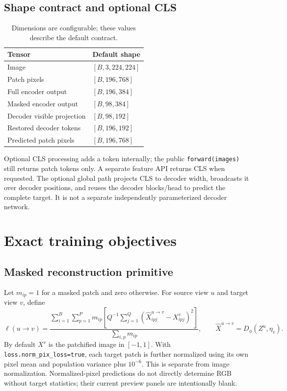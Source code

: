 \documentclass[11pt,a4paper]{article}
\newcommand{\code}[1]{\nolinkurl{#1}}
\begin{document}
\subsection{Shape contract and optional CLS}
\begin{table}[htbp]\centering\small
\begin{tabular}{ll}
\toprule Tensor & Default shape \\\midrule
Image & $[B,3,224,224]$ \\
Patch pixels & $[B,196,768]$ \\
Full encoder output & $[B,196,384]$ \\
Masked encoder output & $[B,98,384]$ \\
Decoder visible projection & $[B,98,192]$ \\
Restored decoder tokens & $[B,196,192]$ \\
Predicted patch pixels & $[B,196,768]$ \\\bottomrule
\end{tabular}
\caption{Dimensions are configurable; these values describe the default contract.}
\end{table}
Optional CLS processing adds a token internally; the public \code{forward(images)}
still returns patch tokens only. A separate feature API returns CLS when requested.
The optional global path projects CLS to decoder width, broadcasts it over decoder
positions, and reuses the decoder blocks/head to predict the complete target.
It is not a separate independently parameterized decoder network.

\section{Exact training objectives}
\subsection{Masked reconstruction primitive}
Let $m_{ip}=1$ for a masked patch and zero otherwise. For source view $u$ and
target view $v$, define
\begin{equation}\label{eq:rec}
\ell(u\!\to\!v)=
\frac{\sum_{i=1}^B\sum_{p=1}^P m_{ip}
\left[Q^{-1}\sum_{j=1}^Q(\widehat{X}^{u\to v}_{ipj}-X^v_{ipj})^2\right]}
{\sum_{i,p}m_{ip}},
\qquad \widehat{X}^{u\to v}=D_\phi(Z^u,\eta_v).
\end{equation}
By default $X^v$ is the patchified image in $[-1,1]$. With
\code{loss.norm_pix_loss=true}, each target patch is further normalized using
its own pixel mean and population variance plus $10^{-6}$. This is separate
from image normalization. Normalized-pixel predictions do not directly determine
RGB without target statistics; their current preview panels are intentionally blank.
\end{document}
